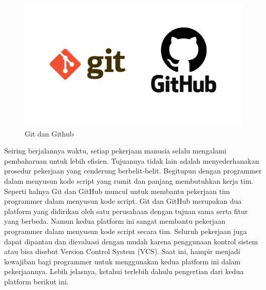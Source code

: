 \begin{figure}[H]
        \centerline{\includegraphics[scale=0.25]{figures/git/git-github-logo}}
        \caption{Git dan Github}
\end{figure}
Seiring berjalannya waktu, setiap pekerjaan manusia selalu mengalami pembaharuan untuk lebih efisien. Tujuannya tidak lain adalah menyederhanakan prosedur pekerjaan yang cenderung berbelit-belit. Begitupun dengan programmer dalam menyusun kode script yang rumit dan panjang membutuhkan kerja tim. Seperti halnya Git dan GitHub muncul untuk membantu pekerjaan tim programmer dalam menyusun kode script. Git dan GitHub merupakan dua platform yang didirikan oleh satu perusahaan dengan tujuan sama serta fitur yang berbeda. Namun kedua platform ini sangat membantu pekerjaan programmer dalam menyusun kode script secara tim. Seluruh pekerjaan juga dapat dipantau dan dievaluasi dengan mudah karena penggunaan kontrol sistem atau bisa disebut Version Control System (VCS). Saat ini, hampir menjadi kewajiban bagi programmer untuk menggunakan kedua platform ini dalam pekerjaannya. Lebih jelasnya, ketahui terlebih dahulu pengertian dari kedua platform berikut ini.


